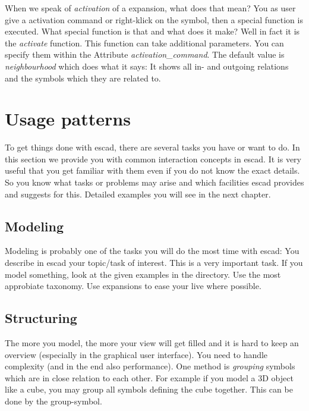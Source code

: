 \documentclass[a4paper, 12pt, openany]{scrbook}
\begin{document}
When we speak of \emph{activation} of a expansion, what does that mean? You as user give a activation command or right-klick on the symbol, then a special function is executed. What special function is that and what does it make? Well in fact it is the \emph{activate} function. This function can take additional parameters. You can specify them within the Attribute \emph{activation\_command}. The default value is \emph{neighbourhood} which does what it says: It shows all in- and outgoing relations and the symbols which they are related to.
\section{Usage patterns}
To get things done with escad, there are several tasks you have or want to do. In this section we provide you with common interaction concepts in escad. It is very useful that you get familiar with them even if you do not know the exact details. So you know what tasks or problems may arise and which facilities escad provides and suggests for this. Detailed examples you will see in the next chapter.
\subsection{Modeling}
Modeling is probably one of the tasks you will do the most time with escad: You describe in escad your topic/task of interest. This is a very important task. If you model something, look at the given examples in the  directory. Use the most approbiate taxonomy. Use expansions to ease your live where possible.
\subsection{Structuring}
The more you model, the more your view will get filled and it is hard to keep an overview (especially in the graphical user interface). You need to handle complexity (and in the end also performance). One method is \emph{grouping} symbols which are in close relation to each other. For example if you model a 3D object like a cube, you may group all symbols defining the cube together. This can be done by the group-symbol.
\end{document}
